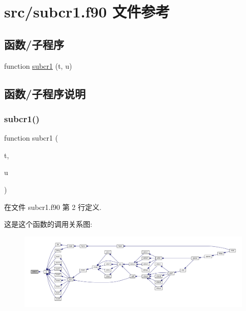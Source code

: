 \hypertarget{subcr1_8f90}{}\section{src/subcr1.f90 文件参考}
\label{subcr1_8f90}
\subsection*{函数/子程序}
\begin{DoxyCompactItemize}
\item 
function \mbox{\hyperlink{subcr1_8f90_a081fb9e78f91fba31eb7d6fffc850678}{subcr1}} (t, u)
\end{DoxyCompactItemize}


\subsection{函数/子程序说明}
\mbox{\label{subcr1_8f90_a081fb9e78f91fba31eb7d6fffc850678}} 
\subsubsection{\texorpdfstring{subcr1()}{subcr1()}}
{\footnotesize\ttfamily function subcr1 (\begin{DoxyParamCaption}\item[{}]{t,  }\item[{}]{u }\end{DoxyParamCaption})}



在文件 subcr1.\+f90 第 2 行定义.

这是这个函数的调用关系图\+:
\nopagebreak
\begin{figure}[H]
\begin{center}
\leavevmode
\includegraphics[width=350pt]{subcr1_8f90_a081fb9e78f91fba31eb7d6fffc850678_icgraph}
\end{center}
\end{figure}
